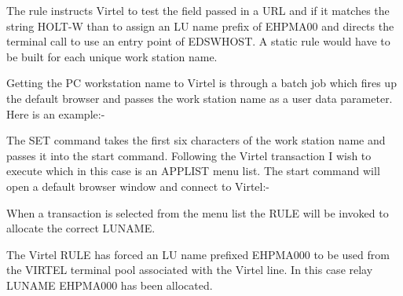 \documentclass[letterpaper,10pt,english]{sphinxmanual}
\begin{document}
The rule instructs Virtel to test the  field passed in a URL and if it matches the string HOLT-W than to assign an LU name prefix of EHPMA00 and directs the terminal call to use an entry point of EDSWHOST. A static rule would have to be built for each unique work station name.

Getting the PC workstation name to Virtel is through a batch job which fires up the default browser and passes the work station name as a user
data parameter. Here is an example:-

\begin{sphinxVerbatim}[commandchars=\\\{\}]
     
 
 
 
  
\end{sphinxVerbatim}

The SET command takes the first six characters of the work station name and passes it into the start command. Following the Virtel transaction I wish to execute which in this case is an APPLIST menu list. The start command will open a default browser window and connect to Virtel:-



When a transaction is selected from the menu list the RULE will be invoked to allocate the correct LUNAME.



The Virtel RULE has forced an LU name prefixed EHPMA000 to be used from the VIRTEL terminal pool associated with the Virtel line. In this case relay LUNAME EHPMA000 has been allocated.
\end{document}

